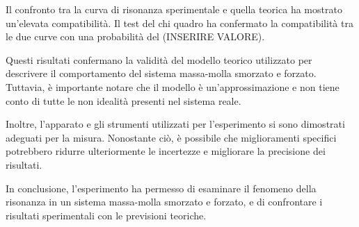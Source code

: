 \documentclass[12pt]{article}
\begin{document}
Il confronto tra la curva di risonanza sperimentale e quella teorica ha mostrato un'elevata 
compatibilità. Il test del chi quadro ha confermato la compatibilità tra le due curve 
con una probabilità del (INSERIRE VALORE).

Questi risultati confermano la validità del modello teorico utilizzato per descrivere il 
comportamento del sistema massa-molla smorzato e forzato. Tuttavia, è importante notare 
che il modello è un'approssimazione e non tiene conto di tutte le non idealità presenti 
nel sistema reale.

Inoltre, l'apparato e gli strumenti utilizzati per l'esperimento si sono dimostrati 
adeguati per la misura. Nonostante ciò, è possibile che miglioramenti specifici potrebbero 
ridurre ulteriormente le incertezze e migliorare la precisione dei risultati.

In conclusione, l'esperimento ha permesso di esaminare il fenomeno della risonanza in un 
sistema massa-molla smorzato e forzato, e di confrontare i risultati sperimentali con le 
previsioni teoriche.
\end{document}
